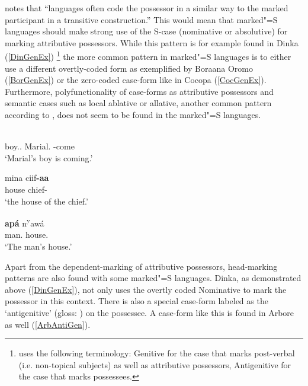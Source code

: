 \citet[590]{Lander:2009} notes that ``languages often code the possessor in a similar way to the marked participant in a transitive construction.''
This would mean that marked"=S languages should make strong use of the S-case (nominative or ab\-so\-lu\-tive) for marking attributive possessors.
While this pattern is for example found in Dinka (\ref{DinGenEx})
\footnote{\citet{Andersen:1991} uses the following terminology: Genitive for the case that marks post-verbal (i.e. non-topical subjects) as well as attributive possessors, Antigenitive for the case that marks possessees.}
 the more common pattern in marked"=S languages is to either use a different overtly-coded form as exemplified by Boraana Oromo (\ref{BorGenEx}) or the zero-coded case-form like in Cocopa (\ref{CocGenEx}). 
Furthermore, polyfunctionality of case-forms as attributive possessors and semantic cases such as local ablative or allative, another common pattern according to \citet[590]{Lander:2009},  does not seem to be found in the marked"=S languages.  

\begin{exe} 
\ex\label{DinGenEx}
\gll{}  \textbf{} \\
boy.\antgen{}.\acc{} \partic{} Marial.\nom{} \decl{}-come\\
\glt `Marial's boy is coming.'
\end{exe}

\begin{exe}
\ex\label{BorGenEx}
\gll mina ciif\textbf{-aa}\\
house chief-\gen{}\\
\glt `the house of the chief.'
\end{exe} 

\begin{exe}\ex\label{CocGenEx}
\gll\textbf{ap\'a} n\textsuperscript{y}aw\'a\\
man.\acc{} house.\acc{}\\
\glt `The man's house.'
\end{exe}


Apart from the dependent-marking of attributive possessors, head-marking patterns are also found with some marked"=S languages.
Dinka, as demonstrated above (\ref{DinGenEx}), not only uses the overtly coded Nominative  to mark the possessor in this context. 
There is also a special case-form labeled as the `antigenitive' (gloss: \antgen{}) on the possessee. 
A case-form like this is found in Arbore as well (\ref{ArbAntiGen}).


